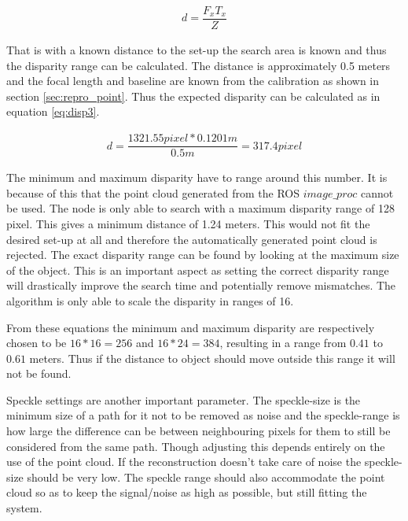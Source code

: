 \begin{equation}\label{eq:disp2}
\begin{split}
 d = \dfrac{F_{x}T_{x}}{ Z}
\end{split}
\end{equation} 

That is with a known distance to the set-up the search area is known and thus the disparity range can be calculated. The distance is approximately 0.5 meters and the focal length and baseline are known from the calibration as shown in section \ref{sec:repro_point}. Thus the expected disparity can be calculated as in equation \ref{eq:disp3}.

\begin{equation}\label{eq:disp3}
\begin{split}
d = \dfrac{1321.55 pixel*0.1201m}{0.5m} = 317.4 pixel
\end{split}
\end{equation}

The minimum and maximum disparity have to range around this number. It is because of this that the point cloud generated from the ROS $image\_proc$ cannot be used. The node is only able to search with a maximum disparity range of 128 pixel. This gives a minimum distance of 1.24 meters. This would not fit the desired set-up at all and therefore the automatically generated point cloud is rejected. The exact disparity range can be found by looking at the maximum size of the object. This is an important aspect as setting the correct disparity range will drastically improve the search time and potentially remove mismatches. The algorithm is only able to scale the disparity in ranges of 16.

From these equations the minimum and maximum disparity are respectively chosen to be $16*16=256$ and $16*24=384$, resulting in a range from $0.41$ to $0.61$ meters. Thus if the distance to object should move outside this range it will not be found.

Speckle settings are another important parameter. The speckle-size is the minimum size of a path for it not to be removed as noise and the speckle-range is how large the difference can be between neighbouring pixels for them to still be considered from the same path. Though adjusting this depends entirely on the use of the point cloud. If the reconstruction doesn't take care of noise the speckle-size should be very low. The speckle range should also accommodate the point cloud so as to keep the signal/noise as high as possible, but still fitting the system. 

